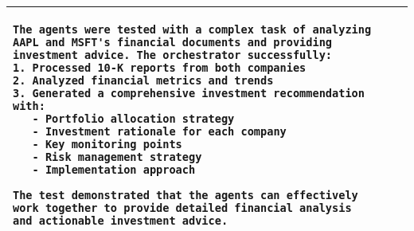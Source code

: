\begin{center}
\begin{longtable}{p{3cm}|p{4.5cm}|p{6cm}}
\begin{lstlisting}
The agents were tested with a complex task of analyzing AAPL and MSFT's financial documents and providing investment advice. The orchestrator successfully:
1. Processed 10-K reports from both companies
2. Analyzed financial metrics and trends
3. Generated a comprehensive investment recommendation with:
   - Portfolio allocation strategy
   - Investment rationale for each company
   - Key monitoring points
   - Risk management strategy
   - Implementation approach

The test demonstrated that the agents can effectively work together to provide detailed financial analysis and actionable investment advice.
\end{lstlisting}\vspace{-0.15in}
\\

\bottomrule
\end{longtable}
\end{center}


% 
